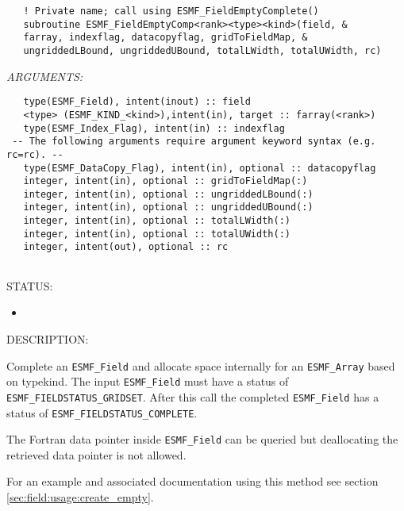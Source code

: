    
\begin{verbatim}   ! Private name; call using ESMF_FieldEmptyComplete() 
   subroutine ESMF_FieldEmptyComp<rank><type><kind>(field, & 
   farray, indexflag, datacopyflag, gridToFieldMap, & 
   ungriddedLBound, ungriddedUBound, totalLWidth, totalUWidth, rc) 
   \end{verbatim}{\em ARGUMENTS:}
\begin{verbatim}   type(ESMF_Field), intent(inout) :: field 
   <type> (ESMF_KIND_<kind>),intent(in), target :: farray(<rank>) 
   type(ESMF_Index_Flag), intent(in) :: indexflag 
 -- The following arguments require argument keyword syntax (e.g. rc=rc). --
   type(ESMF_DataCopy_Flag), intent(in), optional :: datacopyflag 
   integer, intent(in), optional :: gridToFieldMap(:) 
   integer, intent(in), optional :: ungriddedLBound(:) 
   integer, intent(in), optional :: ungriddedUBound(:) 
   integer, intent(in), optional :: totalLWidth(:) 
   integer, intent(in), optional :: totalUWidth(:) 
   integer, intent(out), optional :: rc 
   
   \end{verbatim}
{\sf STATUS:}
   \begin{itemize} 
   \item{} 
   \end{itemize} 
   
{\sf DESCRIPTION:\\ }

 
   \begin{sloppypar} 
   Complete an {\tt ESMF\_Field} and allocate space internally for an 
   {\tt ESMF\_Array} based on typekind. 
   The input {\tt ESMF\_Field} must have a status of 
   {\tt ESMF\_FIELDSTATUS\_GRIDSET}. After this call the completed {\tt ESMF\_Field} 
   has a status of {\tt ESMF\_FIELDSTATUS\_COMPLETE}. 
   \end{sloppypar} 
   
   The Fortran data pointer inside {\tt ESMF\_Field} can be queried but deallocating 
   the retrieved data pointer is not allowed. 
   
   For an example and 
   associated documentation using this method see section 
   \ref{sec:field:usage:create_empty}. 
   
